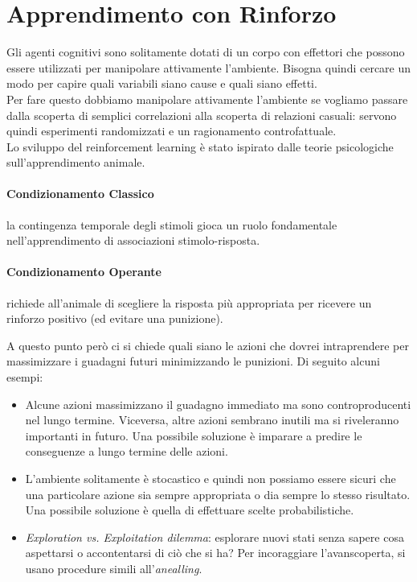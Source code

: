 \newpage
\section{Apprendimento con Rinforzo}
Gli agenti cognitivi sono solitamente dotati di un corpo con effettori che possono essere utilizzati per manipolare attivamente l'ambiente. Bisogna quindi cercare un modo per capire quali variabili siano cause e quali siano effetti.\\
Per fare questo dobbiamo manipolare attivamente l'ambiente se vogliamo passare dalla scoperta di semplici correlazioni alla scoperta di relazioni casuali: servono quindi esperimenti randomizzati e un ragionamento controfattuale.\\
Lo sviluppo del reinforcement learning è stato ispirato dalle teorie psicologiche sull'apprendimento animale.
\paragraph{Condizionamento Classico} la contingenza temporale degli stimoli gioca un ruolo fondamentale nell'apprendimento di associazioni stimolo-risposta.
\paragraph{Condizionamento Operante} richiede all'animale di scegliere la risposta più appropriata per ricevere un rinforzo positivo (ed evitare una punizione).

A questo punto però ci si chiede quali siano le azioni che dovrei intraprendere per massimizzare i guadagni futuri minimizzando le punizioni. Di seguito alcuni esempi:
\begin{itemize}
    \item Alcune azioni massimizzano il guadagno immediato ma sono controproducenti nel lungo termine. Viceversa, altre azioni sembrano inutili ma si riveleranno importanti in futuro. Una possibile soluzione è imparare a predire le conseguenze a lungo termine delle azioni.
    \item L'ambiente solitamente è stocastico e quindi non possiamo essere sicuri che una particolare azione sia sempre appropriata o dia sempre lo stesso risultato. Una possibile soluzione è quella di effettuare scelte probabilistiche.
    \item \textit{Exploration vs. Exploitation dilemma}: esplorare nuovi stati senza sapere cosa aspettarsi o accontentarsi di ciò che si ha? Per incoraggiare l'avanscoperta, si usano procedure simili all'\textit{anealling}.
\end{itemize}

